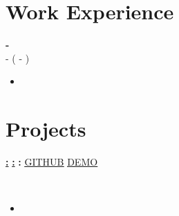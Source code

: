 \documentclass[letterpaper, 11pt]{article}
\newcommand{\bulletSpace}{\vspace{-5pt}}
\newcommand{\secStartSpace}{\vspace{3pt}}
\newcommand{\secEndSpace}{\vspace{5pt}}
\newcommand{\spaceCollapse}{\vspace{-5pt}}
\begin{document}
\section{\color{black} \textbf{Work Experience}}
\secStartSpace
\begin{addmargin}[0em]{1em}

    \noindent \textbf{} \hfill \textbf{ - }\\
    \textit{}
    - ( - )
    \\

    \begin{itemize}[leftmargin=1.5em]
    \vspace{-5px}
    \item {}
    \bulletSpace
    \end{itemize}
    \vspace{3px}

\end{addmargin}
\secEndSpace



\section{\color{black} \textbf{Projects}}
\secStartSpace
\begin{addmargin}[0em]{1em}

    \noindent
    \href{\VAR{ project.demoUrl }}{\textbf{:}}
    \href{\VAR{ project.demoUrl }}{\textbf{:}}
    \textbf{:}
    \hfill
     \href{\VAR{ project.githubUrl }}{\underline{GITHUB}}
     \href{\VAR{ project.demoUrl }}{\underline{DEMO}}

    \\\noindent {} \spaceCollapse
    \begin{itemize}[leftmargin=1.5em]
    \item {} \bulletSpace
    \end{itemize}
\end{addmargin}
\end{document}
